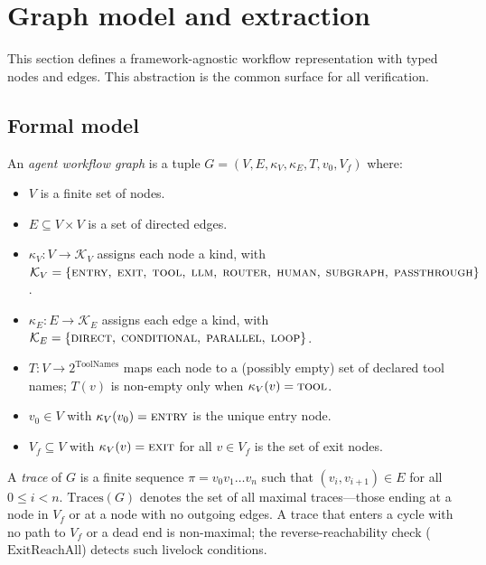 \section{Graph model and extraction}
\label{sec:graph_model}

This section defines a framework-agnostic workflow representation with typed nodes
and edges. This abstraction is the common surface for all verification.

\subsection{Formal model}

\begin{definition}
\label{def:awg}
An \emph{agent workflow graph} is a tuple
$G = (V, E, \kappa_V, \kappa_E, T, v_0, V_f)$ where:
\begin{itemize}
  \item $V$ is a finite set of nodes.
  \item $E \subseteq V \times V$ is a set of directed edges.
  \item $\kappa_V: V \to \mathcal{K}_V$ assigns each node a kind, with\\
    $\mathcal{K}_V = \{\textsc{entry},\; \textsc{exit},\;
    \textsc{tool},\; \textsc{llm},\; \textsc{router},\;
    \textsc{human},\; \textsc{subgraph},\;
    \textsc{passthrough}\}$.
  \item $\kappa_E: E \to \mathcal{K}_E$ assigns each edge a kind, with\\
    $\mathcal{K}_E = \{\textsc{direct},\; \textsc{conditional},\;
    \textsc{parallel},\; \textsc{loop}\}$.
  \item $T: V \to 2^{\text{ToolNames}}$ maps each node to a (possibly
    empty) set of declared tool names; $T(v)$ is non-empty only when
    $\kappa_V(v) = \textsc{tool}$.
  \item $v_0 \in V$ with $\kappa_V(v_0) = \textsc{entry}$ is the unique
    entry node.
  \item $V_f \subseteq V$ with $\kappa_V(v) = \textsc{exit}$ for all
    $v \in V_f$ is the set of exit nodes.
\end{itemize}
\end{definition}

\begin{definition}
\label{def:trace}
A \emph{trace} of $G$ is a finite sequence $\pi = v_0 v_1 \ldots v_n$
such that $(v_i, v_{i+1}) \in E$ for all $0 \le i < n$.
$\mathrm{Traces}(G)$ denotes the set of all maximal traces---those
ending at a node in $V_f$ or at a node with no outgoing edges.
A trace that enters a cycle with no path to $V_f$ or a dead end is
non-maximal; the reverse-reachability check ($\mathrm{ExitReachAll}$)
detects such livelock conditions.
\end{definition}

